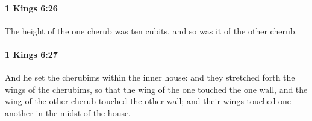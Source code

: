 		\paragraph{1 Kings 6:26} %
			\label{1KINGS-6-26}

			The height of the one cherub was ten cubits, and so was it of the other cherub.


		\paragraph{1 Kings 6:27} %
			\label{1KINGS-6-27}

			And he set the cherubims within the inner house: and they stretched forth the wings of the cherubims, so that the wing of the one touched the one wall, and the wing of the other cherub touched the other wall; and their wings touched one another in the midst of the house.


